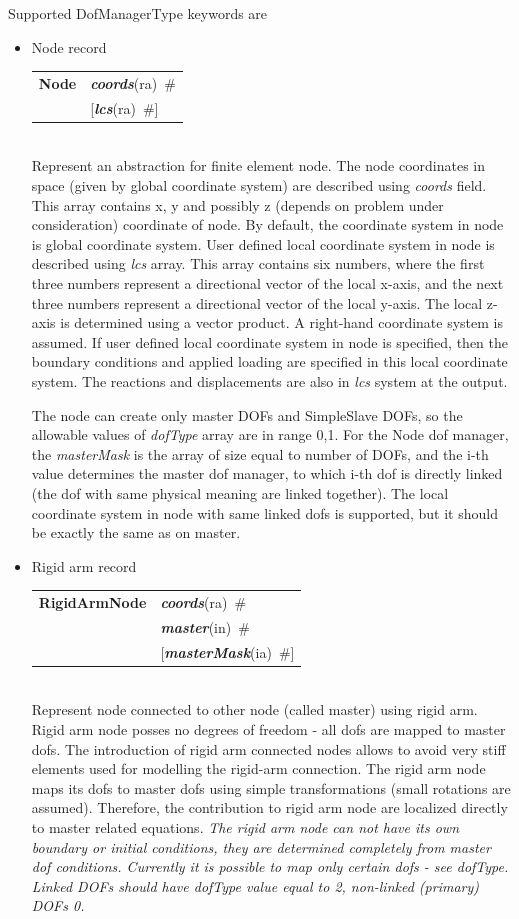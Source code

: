 \documentclass[a4paper]{article}
\makeatletter
\newcommand{\param}[1]{{\em #1}}
\newcommand{\keywordnotype}[1]{\mbox{{\it{\bf{#1}}}}}
\newcommand{\keyword}[2]{\mbox{{\keywordnotype{#1}\tiny (#2)}}}
\newcommand{\entKeywordInst}[1]{\mbox{{\bf{{#1}}}}}
\newcommand{\field}[2]{\mbox{\keyword{#1}{#2}~\#}}
\newcommand{\optField}[2]{\mbox{[\field{#1}{#2}]}}
\newenvironment{record}[1][]{\begin{tabular}{|ll}}{\end{tabular}\\}
\newcommand{\recentry}[2]{{#1}&{#2}\\}
\newcounter{rcc}
\newenvironment{record}[1][\textwidth]{\setcounter{rcc}{0}\begin{tabular*}{#1}{|ll@{\extracolsep{\fill}}r}}{\end{tabular*}\\}
\newcommand{\recentry}[2]{\ifthenelse{\value{rcc}>0}{&$\backslash$ \\}{\setcounter{rcc}{1}}{#1}&{#2}}
\makeatother
\begin{document}
Supported DofManagerType keywords are
\begin{itemize}
\item Node record

  \begin{record}[0.9\textwidth]
    \recentry{\entKeywordInst{Node}}{\field{coords}{ra}}
    \recentry{}{[\field{lcs}{ra}]}
  \end{record}
  Represent an abstraction for finite element node.
The node
coordinates in space (given by global coordinate system) are described
using \param{coords} field. This array contains x, y and possibly z
(depends on problem under consideration) coordinate of node.
By default, the coordinate system in node is global coordinate system.
User defined local coordinate system in node is described using \param{lcs} array. This
array contains six numbers, where the first three numbers represent
a directional vector of the local x-axis, and the next three numbers represent
a directional vector of the local y-axis. The local z-axis is determined
using a vector product. A right-hand coordinate system is assumed.
If user defined local coordinate system in node is specified, then the
boundary conditions and applied loading are specified in this local coordinate system.
The reactions and displacements are also in \param{lcs} system at the output.

The node can create only master DOFs and SimpleSlave DOFs, so the
allowable values of \param{dofType} array are in range {0,1}.
For the Node dof manager, the \param{masterMask} is the array of size
equal to number of DOFs, and the i-th value determines the
master dof manager, to which i-th dof is directly linked (the dof with
same physical meaning are linked together).
The local coordinate
system in node with same linked dofs is supported, but it should be exactly the
same as on master.


\item Rigid arm record

  \begin{record}[0.9\textwidth]
    \recentry{\entKeywordInst{RigidArmNode}}{\field{coords}{ra}}
    \recentry{}{\field{master}{in}} \recentry{}{\optField{masterMask}{ia}}
  \end{record}
  Represent node connected to other node (called master) using rigid
arm. Rigid arm node posses no degrees of freedom	- all dofs are mapped to master
dofs. The introduction of rigid arm connected nodes allows to avoid very
stiff elements used for modelling the rigid-arm connection.
The rigid
arm node maps its dofs to master dofs using simple transformations
(small rotations are assumed). Therefore, the contribution to rigid
arm node are localized directly to master related equations.
{\em The rigid arm node can not have its own boundary or initial conditions, they are
determined completely from master dof conditions. Currently it is
possible to map only certain dofs - see \param{dofType}. Linked DOFs
should have dofType value equal to 2, non-linked (primary) DOFs 0.}


\end{itemize}
\end{document}
